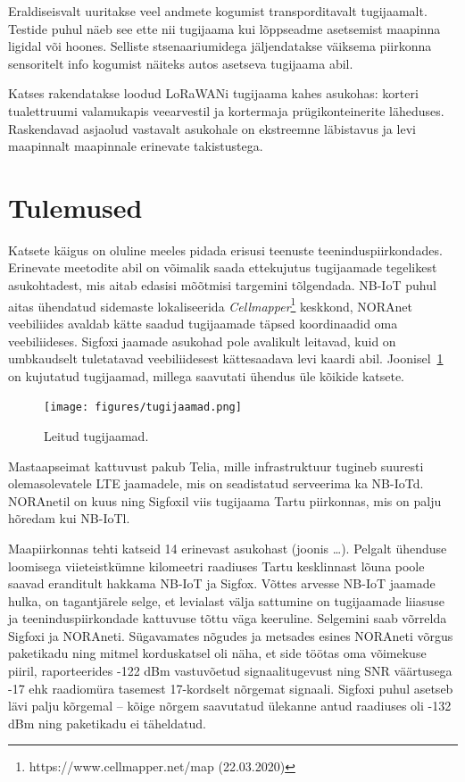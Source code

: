 \documentclass[12pt]{article}
\begin{document}
    Eraldiseisvalt uuritakse veel andmete kogumist transporditavalt tugijaamalt.
    Testide puhul näeb see ette nii tugijaama kui lõppseadme asetsemist maapinna ligidal või hoones.
    Selliste stsenaariumidega jäljendatakse väiksema piirkonna sensoritelt info kogumist näiteks autos asetseva tugijaama abil.

    Katses rakendatakse loodud LoRaWANi tugijaama kahes asukohas: korteri tualettruumi valamukapis veearvestil ja kortermaja prügikonteinerite läheduses.
    Raskendavad asjaolud vastavalt asukohale on ekstreemne läbistavus ja levi maapinnalt maapinnale erinevate takistustega.

    \newpage
    \section{Tulemused}

    Katsete käigus on oluline meeles pidada erisusi teenuste teeninduspiirkondades.
    Erinevate meetodite abil on võimalik saada ettekujutus tugijaamade tegelikest asukohtadest, mis aitab edasisi mõõtmisi targemini tõlgendada.
    NB-IoT puhul aitas ühendatud sidemaste lokaliseerida \textit{Cellmapper}\footnote{https://www.cellmapper.net/map (22.03.2020)} keskkond, NORAnet veebiliides avaldab kätte saadud tugijaamade täpsed koordinaadid oma veebiliideses.
    Sigfoxi jaamade asukohad pole avalikult leitavad, kuid on umbkaudselt tuletatavad veebiliidesest kättesaadava levi kaardi abil.
    Joonisel~\ref{fig:tugijaamad} on kujutatud tugijaamad, millega saavutati ühendus üle kõikide katsete.

    \begin{figure} [ht]
        \begin{center}
            \texttt{[image: figures/tugijaamad.png]}
            \caption{Leitud tugijaamad.}
            \label{fig:tugijaamad}
        \end{center}
    \end{figure}

    Mastaapseimat kattuvust pakub Telia, mille infrastruktuur tugineb suuresti olemasolevatele LTE jaamadele, mis on seadistatud serveerima ka NB-IoTd.
    NORAnetil on kuus ning Sigfoxil viis tugijaama Tartu piirkonnas, mis on palju hõredam kui NB-IoTl.

    Maapiirkonnas tehti katseid 14 erinevast asukohast (joonis \ldots). Pelgalt ühenduse loomisega viieteistkümne kilomeetri raadiuses Tartu kesklinnast lõuna poole saavad eranditult hakkama NB-IoT ja Sigfox.
    Võttes arvesse NB-IoT jaamade hulka, on tagantjärele selge, et levialast välja sattumine on tugijaamade liiasuse ja teeninduspiirkondade kattuvuse tõttu väga keeruline.
    Selgemini saab võrrelda Sigfoxi ja NORAneti.
    Sügavamates nõgudes ja metsades esines NORAneti võrgus paketikadu ning mitmel korduskatsel oli näha, et side töötas oma võimekuse piiril, raporteerides -122 dBm vastuvõetud signaalitugevust ning SNR väärtusega -17 ehk raadiomüra tasemest 17-kordselt nõrgemat signaali.
    Sigfoxi puhul asetseb lävi palju kõrgemal -- kõige nõrgem saavutatud ülekanne antud raadiuses oli -132 dBm ning paketikadu ei täheldatud.
\end{document}
